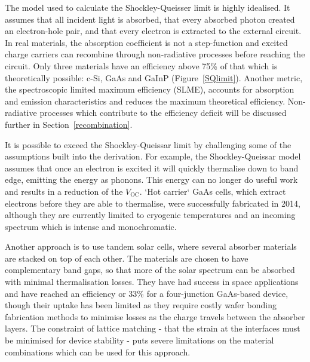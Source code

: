 The model used to calculate the Shockley-Queisser limit is highly idealised. It assumes that all incident light is absorbed, that every absorbed photon created an electron-hole pair, and that every electron is extracted to the external circuit. In real materials, the absorption coefficient is not a step-function and excited charge carriers can recombine through non-radiative processes before reaching the circuit. Only three materials have an efficiency above 75\% of that which is theoretically possible: c-Si, GaAs and GaInP (Figure\ \ref{SQlimit}). Another metric, the spectroscopic limited maximum efficiency (SLME), accounts for absorption and emission characteristics and reduces the maximum theoretical efficiency.\autocite{Yu2012} Non-radiative processes which contribute to the efficiency deficit will be discussed further in Section\ \ref{recombination}.


It is possible to exceed the Shockley-Queissar limit by challenging some of the assumptions built into the derivation. For example, the Shockley-Queissar model assumes that once an electron is excited it will quickly thermalise down to band edge, emitting the energy as phonons. This energy can no longer do useful work and results in a reduction of the $V_{\text{OC}}$. `Hot carrier` GaAs cells, which extract electrons before they are able to thermalise, were successfully fabricated in 2014, although they are currently limited to cryogenic temperatures and an incoming spectrum which is intense and monochromatic. 

Another approach is to use tandem solar cells, where several absorber materials are stacked on top of each other. The materials are chosen to have complementary band gaps, so that more of the solar spectrum can be absorbed with minimal thermalisation losses. They have had success in space applications and have reached an efficiency or 33\% for a four-junction GaAs-based device, though their uptake has been limited as they require costly wafer bonding fabrication methods to minimise losses as the charge travels between the absorber layers. The constraint of lattice matching - that the strain at the interfaces must be minimised for device stability - puts severe limitations on the material combinations which can be used for this approach. 



